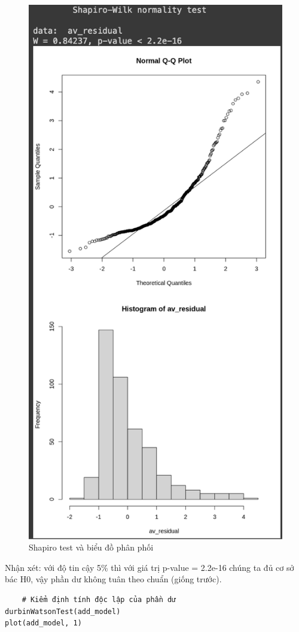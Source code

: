 \begin{itemize}
\begin{figure}[H]
    \centering
    \includegraphics[width=0.8\linewidth]{part23_figures/33.png}
    \caption{Shapiro test và biểu đồ phân phối}
    \label{fig:Shapiro test và biểu đồ phân phối}
\end{figure}

Nhận xét: với độ tin cậy 5\% thì với giá trị p-value = 2.2e-16 chúng ta đủ cơ sở bác H0, vậy phần dư không tuân theo chuẩn (giống trước).

\begin{lstlisting}
    # Kiểm định tính độc lập của phần dư
durbinWatsonTest(add_model)
plot(add_model, 1)
\end{lstlisting}


\end{itemize}

